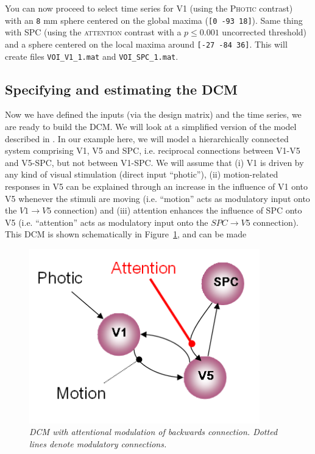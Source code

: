 You can now proceed to select time series for V1 (using the \textsc{Photic} contrast) with an \texttt{8} mm sphere centered on the global maxima (\texttt{[0 -93 18]}). Same thing with SPC (using the \textsc{attention} contrast with a $p \leq 0.001$ uncorrected threshold) and a sphere centered on the local maxima around \texttt{[-27 -84 36]}. This will create files \texttt{VOI\_V1\_1.mat} and \texttt{VOI\_SPC\_1.mat}.

\subsection{Specifying and estimating the DCM}

Now we have defined the inputs (via the design matrix) and the time series, we are ready to build the DCM. We will look at a simplified version of the model described in \cite{dcm}.  In our example here, we will model a hierarchically connected system comprising V1, V5 and SPC, i.e. reciprocal connections between V1-V5 and V5-SPC, but not between V1-SPC. We will assume that (i) V1 is driven by any kind of visual stimulation (direct input ``photic''), (ii) motion-related responses in V5 can be explained through an increase in the influence of V1 onto V5 whenever the stimuli are moving (i.e. ``motion'' acts as modulatory input onto the $V1 \rightarrow V5$ connection) and (iii) attention enhances the influence of SPC onto V5 (i.e. ``attention'' acts as modulatory input onto the $SPC \rightarrow V5$ connection). This DCM is shown schematically in Figure~\ref{bwd}, and can be made
\begin{figure}[ht]
\begin{center}
\includegraphics[width=100mm]{dcm/dcm_mod_bwd}
\caption{\em DCM with attentional modulation of backwards connection. Dotted lines denote modulatory connections.\label{bwd}}
\end{center}
\end{figure}
